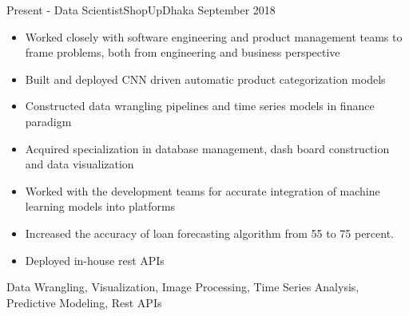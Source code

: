 %
%
%
\begin{experiences}
  \experience
    {Present - }   {Data Scientist}{ShopUp}{Dhaka}
    {September 2018} {
                      \begin{itemize}
                        \item Worked closely with software engineering and product management teams to frame problems, both from engineering and business perspective
                        
                        
                        \item Built and deployed CNN driven automatic product categorization models 
                        
                        \item Constructed data wrangling pipelines and time series models in finance paradigm          
                        
                        \item Acquired specialization in database management, dash board construction and data visualization
                        
                        \item Worked with the development teams for accurate integration of machine learning models into platforms
                        
                        \item Increased the accuracy of loan forecasting algorithm from 55 to 75 percent.
                        
                        \item Deployed in-house rest APIs\\
                                                                   
                      \end{itemize}
                    }
                    {Data Wrangling, Visualization, Image Processing, Time Series Analysis, Predictive Modeling, Rest APIs}
  \emptySeparator
                        

\end{experiences}

